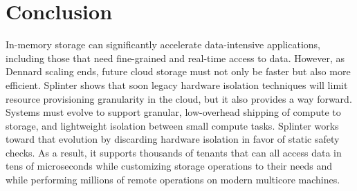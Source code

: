 \section{Conclusion}
\label{sec:conclusion}

In-memory storage can significantly accelerate
  data-intensive applications, including those that need fine-grained and
  real-time access to data.
However, as Dennard scaling ends, future cloud storage must not only be faster
  but also more efficient.
Splinter shows that soon legacy hardware isolation techniques will
  limit resource provisioning granularity in the cloud, but it also provides a
  way forward.
Systems must evolve to support granular, low-overhead shipping of compute to
    storage, and lightweight isolation between small compute tasks.
Splinter works toward that evolution by discarding hardware isolation in
  favor of static safety checks.
As a result, it supports thousands of tenants that can all access data in tens of
  microseconds while customizing storage operations to their needs and while
  performing millions of remote operations on modern multicore machines.

